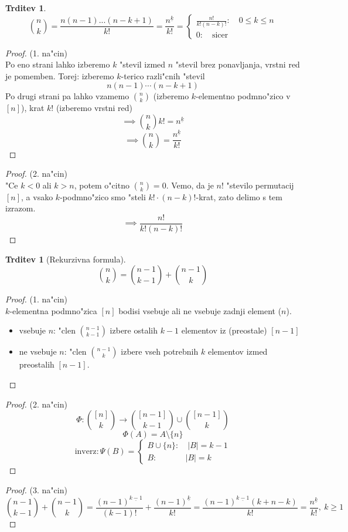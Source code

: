 \documentclass[a4paper,12pt]{article}
\theoremstyle{definition}
\newtheorem{claim}[counter]{Trditev}
\theoremstyle{remark}
\begin{document}
\begin{claim}
	\[\binom{n}{k} = \frac{n(n-1)...(n-k+1)}{k!} = \frac{n^{\underline{k}}}{k!} = \begin{cases}\frac{n!}{k!(n-k)!}: \quad 0 \leqslant k \leqslant n   \\ 0: \quad \text{sicer} \end{cases}\]
\end{claim}
\begin{proof}(1. na"cin)\\
	Po eno strani lahko izberemo $k$ "stevil izmed $n$ "stevil brez ponavljanja, vrstni red je pomemben.
	Torej: izberemo $k$-terico razli"cnih "stevil
	\[n(n-1)\cdots(n-k+1)\]
	Po drugi strani pa lahko vzamemo $\binom{n}{k}$ (izberemo $k$-elementno podmno"zico v $[n]$), krat $k!$ (izberemo vrstni red)
	\[\implies \binom{n}{k} k! = n^{\underline{k}}\]
	\[\implies \binom{n}{k} = \frac{n^{\underline{k}}}{k!}\]
\end{proof}
\begin{proof}(2. na"cin)\\
	"Ce $k < 0$ ali $k > n$, potem o"citno $\binom{n}{k} = 0$. Vemo, da je $n!$ "stevilo permutacij $[n]$, a vsako $k$-podmno"zico smo "steli $k!\cdot(n-k)!$-krat, zato delimo s tem izrazom.
	\[\implies \frac{n!}{k! (n-k)!}\]
\end{proof}

\begin{claim}[Rekurzivna formula]
	\[\binom{n}{k} = \binom{n-1}{k-1} + \binom{n-1}{k}\]
\end{claim}

\begin{proof}(1. na"cin)\\
	$k$-elementna podmno"zica $[n]$ bodisi vsebuje ali ne vsebuje zadnji element ($n$).
	\begin{itemize}
	    \item vsebuje $n$: "clen $\binom{n-1}{k-1}$ izbere ostalih $k-1$ elementov iz (preostale) $[n-1]$
	    \item ne vsebuje $n$: "clen $\binom{n-1}{k}$ izbere vseh potrebnih $k$ elementov izmed preostalih $[n-1]$.
	\end{itemize}
\end{proof}
\begin{proof}(2. na"cin)\\
	\[\Phi : \binom{[n]}{k}\rightarrow \binom{[n - 1]}{k - 1} \cup \binom{[n - 1]}{k}\]
	\[\Phi (A) = A \setminus \{n\}\]
	\[\text{inverz}: \Psi(B) = \begin{cases}B \cup \{n\}: \quad |B| = k - 1 \\ B: \qquad \quad \ \ |B| = k \end{cases}\]
\end{proof}
\begin{proof}(3. na"cin)\\
	\[\binom{n - 1}{k - 1}+\binom{n-1}{k} = \frac{(n-1)^{\underline{k-1}}}{(k-1)!} + \frac{(n-1)^{\underline{k}}}{k!} = \frac{(n-1)^{\underline{k-1}}(k+n-k)}{k!} = \frac{n^{\underline{k}}}{k!}, \ k \geqslant1\]
\end{proof}
\end{document}
